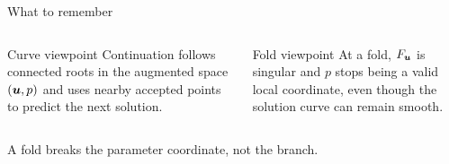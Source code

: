 \begin{frame}{What to remember}
\begin{columns}[T,onlytextwidth]
\begin{block}{Curve viewpoint}
Continuation follows connected roots in the augmented space $(\bm{u},p)$ and
uses nearby accepted points to predict the next solution.
\end{block}

\begin{block}{Fold viewpoint}
At a fold, $F_{\bm{u}}$ is singular and $p$ stops being a valid local
coordinate, even though the solution curve can remain smooth.
\end{block}
\end{columns}

\vfill
\centering
\large\textcolor{JaxTeal}{A fold breaks the parameter coordinate, not the branch.}
\end{frame}

